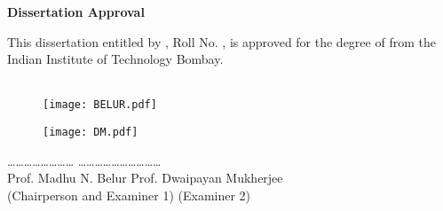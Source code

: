 \pagestyle{plain}



\thispagestyle{empty} %

\vspace{-1in}
\begin{center}
{\LARGE  {\bf Dissertation Approval}}
\end{center}
\vspace*{0.1in} \noindent This dissertation entitled {\large \bf \dissertationTitle} by {\bf \large \authornames}, Roll No. \authorrollno, is approved for the degree of  {\large \bf \degree} from the Indian Institute of Technology Bombay.\\\\

\vspace{1em}
\begin{figure}[H]
\centering
\begin{minipage}{0.6\linewidth}
\texttt{[image: BELUR.pdf]}
\end{minipage}
\begin{minipage}{0.35\linewidth}
\texttt{[image: DM.pdf]}
\end{minipage}
\end{figure}
\vspace{-1em}
  \vspace{-2em}
  \hspace*{0.8cm}\ldots\ldots \ldots\ldots \ldots\ldots \ldots\ldots  \hspace{1.85in}  \ldots\ldots \ldots\ldots \ldots\ldots \ldots\ldots \ldots\ldots \\
  \hspace*{0.4cm}\hspace*{0.4cm} Prof. Madhu N. Belur \hspace{2in} Prof. Dwaipayan Mukherjee\\
  \hspace*{0.1cm} (Chairperson and Examiner 1) \hspace{2.2in} (Examiner 2)\\\\

